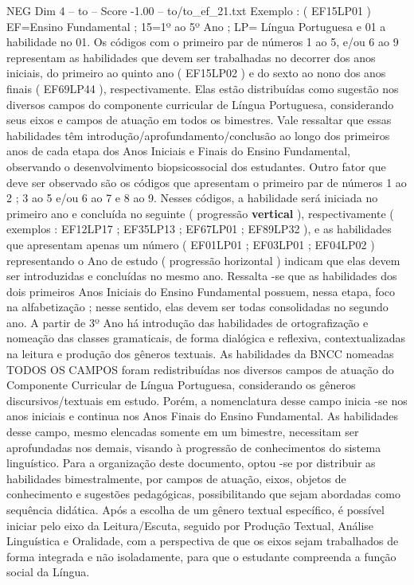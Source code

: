 \begin{textsample}{NEG Dim 4 – to – Score -1.00 – to/to\_ef\_21.txt}
Exemplo : ( EF15LP01 ) EF=Ensino Fundamental ; 15=1º ao 5º Ano ; LP= Língua Portuguesa e 01 a habilidade no 01.
Os códigos com o primeiro par de números 1 ao 5, e/ou 6 ao 9 representam as habilidades que devem ser trabalhadas no decorrer dos anos iniciais, do primeiro ao quinto ano ( EF15LP02 ) e do sexto ao nono dos anos finais ( EF69LP44 ), respectivamente.
Elas estão distribuídas como sugestão nos diversos campos do componente curricular de Língua Portuguesa, considerando seus eixos e campos de atuação em todos os bimestres.
Vale ressaltar que essas habilidades têm introdução/aprofundamento/conclusão ao longo dos primeiros anos de cada etapa dos Anos Iniciais e Finais do Ensino Fundamental, observando o desenvolvimento biopsicossocial dos estudantes.
Outro fator que deve ser observado são os códigos que apresentam o primeiro par de números 1 ao 2 ; 3 ao 5 e/ou 6 ao 7 e 8 ao 9.
Nesses códigos, a habilidade será iniciada no primeiro ano e concluída no seguinte ( progressão \textbf{vertical} ), respectivamente ( exemplos : EF12LP17 ; EF35LP13 ; EF67LP01 ; EF89LP32 ), e as habilidades que apresentam apenas um número ( EF01LP01 ; EF03LP01 ; EF04LP02 ) representando o Ano de estudo ( progressão horizontal ) indicam que elas devem ser introduzidas e concluídas no mesmo ano.
Ressalta -se que as habilidades dos dois primeiros Anos Iniciais do Ensino Fundamental possuem, nessa etapa, foco na alfabetização ; nesse sentido, elas devem ser todas consolidadas no segundo ano.
A partir de 3º Ano há introdução das habilidades de ortografização e nomeação das classes gramaticais, de forma dialógica e reflexiva, contextualizadas na leitura e produção dos gêneros textuais.
As habilidades da BNCC nomeadas TODOS OS CAMPOS foram redistribuídas nos diversos campos de atuação do Componente Curricular de Língua Portuguesa, considerando os gêneros discursivos/textuais em estudo.
Porém, a nomenclatura desse campo inicia -se nos anos iniciais e continua nos Anos Finais do Ensino Fundamental.
As habilidades desse campo, mesmo elencadas somente em um bimestre, necessitam ser aprofundadas nos demais, visando à progressão de conhecimentos do sistema linguístico.
Para a organização deste documento, optou -se por distribuir as habilidades bimestralmente, por campos de atuação, eixos, objetos de conhecimento e sugestões pedagógicas, possibilitando que sejam abordadas como sequência didática.
Após a escolha de um gênero textual específico, é possível iniciar pelo eixo da Leitura/Escuta, seguido por Produção Textual, Análise Linguística e Oralidade, com a perspectiva de que os eixos sejam trabalhados de forma integrada e não isoladamente, para que o estudante compreenda a função social da Língua.

\end{textsample}
